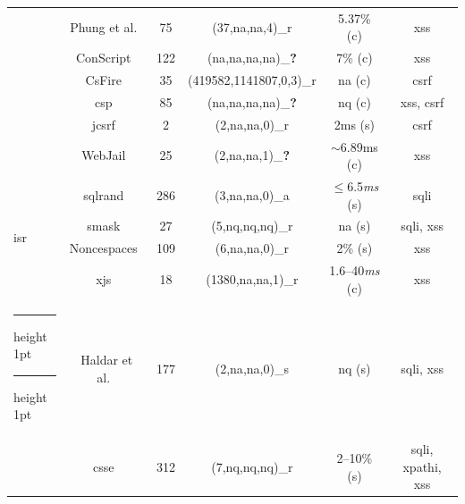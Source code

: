 \documentclass[conference]{IEEEtran}
\makeatletter
\newcommand{\thickhline}{%
    \noalign {\ifnum 0=`}\fi \hrule height 1pt
    \futurelet \reserved@a \@xhline
}
\makeatother
\begin{document}
\begin{table}[t]
\begin{threeparttable}
\begin{small}
{\begin{tabular}{l|c|c|cc|c}
  &   Phung et al.~\cite{PSC09} & 75 & (37,{\sc na},{\sc na},4)\_r & 5.37\% ({\sc c}) & {\sc xss} \\
  &   ConScript~\cite{ML10} & 122 & ({\sc na},{\sc na},{\sc na},{\sc na})\_{\bf ?} & 7\% ({\sc c}) & {\sc xss} \\
  &   CsFire~\cite{DDHPJ10} & 35 & (419582,1141807,0,3)\_r\tnote{5} & {\sc na} ({\sc c}) & {\sc csrf} \\
  &   {\sc csp}~\cite{SSM10} & 85 & ({\sc na},{\sc na},{\sc na},{\sc na})\_{\bf ?} & {\sc nq} ({\sc c}) & {\sc xss}, {\sc csrf} \\
  &   j{\sc csrf}~\cite{PS11} & 2 & (2,{\sc na},{\sc na},0)\_r & 2ms ({\sc s}) & {\sc csrf} \\
  &   WebJail~\cite{VDDPJ11} & 25 & (2,{\sc na},{\sc na},1)\_{\bf ?} & $\sim$6.89ms ({\sc c}) & {\sc xss} \\
  \hline
  \multirow{4}{*}{{\sc isr}}
  &   {\sc sql}rand~\cite{BK04} & 286 & (3,{\sc na},{\sc na},0)\_a & $\le$6.5{\it ms} ({\sc s}) & {\sc sql}i \\
  &   {\sc sm}ask~\cite{JB07} & 27 & (5,{\sc nq},{\sc nq},{\sc nq})\_r  & {\sc na} ({\sc s}) & {\sc sql}i, {\sc xss} \\
  &   Noncespaces~\cite{GC09} & 109 & (6,{\sc na},{\sc na},0)\_r &  2\% ({\sc s}) & {\sc xss} \\ 
  &   x{\sc js}~\cite{APKLM10} & 18 & (1380,{\sc na},{\sc na},1)\_r & 1.6--40{\it ms} ({\sc c}) & {\sc xss} \\
  \thickhline
  \thickhline
  \multirow{7}{*}{Taint Tracking}
  &   Haldar et al.~\cite{HCF05} & 177 & (2,{\sc na},{\sc na},0)\_s & {\sc nq} ({\sc s}) & {\sc sql}i, {\sc xss} \\ 
  &   {\sc csse}~\cite{PB05} & 312 & (7,{\sc nq},{\sc nq},{\sc nq})\_r & 2--10\% ({\sc s}) & {\sc sql}i, {\sc xp}athi, {\sc xss} \\

\end{tabular}}
\end{small}
\end{threeparttable}
\end{table}
\end{document}
